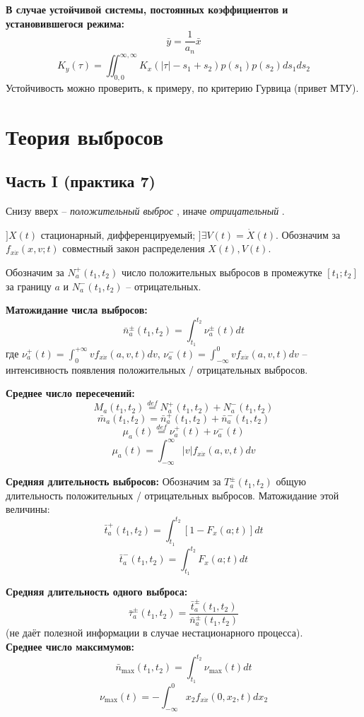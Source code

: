 \documentclass[a4paper,11pt, twocolumn]{article}
\newcommand{\defeq}{\overset{def}=}
\begin{document}
\textbf{ В случае устойчивой системы, постоянных коэффициентов и установившегося режима: }
\[ \bar y = \frac{1}{a_n} \bar x \]
\[ K_y(\tau) = \iint_{0,0}^{\infty, \infty} K_x(|\tau| - s_1 + s_2) p(s_1)p(s_2) ds_1 ds_2 \]
Устойчивость можно проверить, к примеру, по критерию Гурвица (привет МТУ).


\section{ Теория выбросов }

\subsection{ Часть I (практика 7) }

Снизу вверх -- \emph{ положительный выброс }, иначе \emph{ отрицательный }.

$ ] X(t) $ стационарный, дифференцируемый; $ ] \exists V(t) = \dot X(t) $.
Обозначим за $ f_{x \dot x}(x,v;t) $ совместный закон распределения $ X(t), V(t) $.

Обозначим за $ N_a^+(t_1, t_2) $ число положительных выбросов в промежутке $ [t_1;t_2] $ за границу $ a $ и $ N_a^-(t_1, t_2) $ -- отрицательных.

\textbf{ Матожидание числа выбросов: }
\[ \bar n_a^\pm (t_1,t_2) = \int_{t_1}^{t_2} \nu_a^\pm (t) dt \]
где $ \nu_a^+ (t) = \int_{0}^{+\infty} v f_{x \dot x}(a,v,t)dv $, $ \nu_a^- (t) = \int_{- \infty}^{0} v f_{x \dot x}(a,v,t)dv $ -- интенсивность появления положительных / отрицательных выбросов.

\textbf{ Среднее число пересечений: }
\[ M_a(t_1, t_2) \defeq N_a^+(t_1, t_2) + N_a^- (t_1,t_2) \]
\[ \bar m_a(t_1,t_2) = \bar n_a^+ (t_1,t_2) + \bar n_a^- (t_1,t_2) \]
\[ \mu_a(t) \defeq \nu_a^+ (t) + \nu_a^- (t) \]
\[ \mu_a(t) = \int_{ -\infty }^{ \infty } |v| f_{x \dot x}(a, v, t) dv \]

\textbf{ Средняя длительность выбросов: }
Обозначим за $ T_a^\pm (t_1, t_2) $ общую длительность положительных / отрицательных выбросов.
Матожидание этой величины:
\[ \bar t_a^+ (t_1,t_2) = \int_{t_1}^{t_2}[1 - F_x(a;t)]dt \]
\[ \bar t_a^- (t_1,t_2) = \int_{t_1}^{t_2}F_x(a;t)dt \]

\textbf{ Средняя длительность одного выброса: }
\[ \bar \tau_a^\pm(t_1,t_2) = \frac{ \bar t_a^\pm (t_1, t_2) }{ \bar n_a^\pm (t_1, t_2) } \]
(не даёт полезной информации в случае нестационарного процесса). \\

\textbf{ Среднее число максимумов: }
\[ \bar n_{\max}(t_1,t_2) = \int_{t_1}^{t_2} \nu_{\max}(t) dt \]
\[ \nu_{\max} (t) = - \int_{- \infty}^{0} x_2 f_{x \dot x} (0, x_2, t) dx_2 \]
\end{document}
